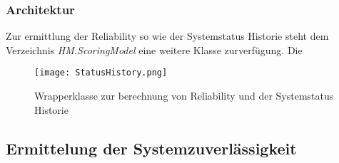 \subsubsection*{Architektur}
Zur ermittlung der Reliability so wie der Systemstatus Historie steht dem Verzeichnis \textit{HM.ScoringModel} eine weitere Klasse zurverfügung. Die 
\begin{center}
    \begin{figure}[h!]
        \centering
        \texttt{[image: StatusHistory.png]}
        \caption{Wrapperklasse zur berechnung von Reliability und der Systemstatus Historie}
        \label{fig:SystemHistory}
    \end{figure}
\end{center}
\vspace{-0.5cm}


\subsection{Ermittelung der Systemzuverlässigkeit}